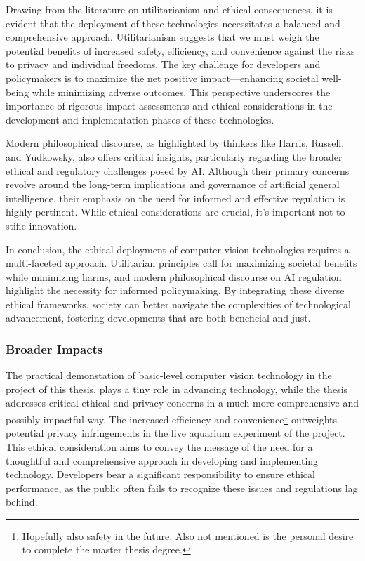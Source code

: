Drawing from the literature on utilitarianism and ethical consequences, it is evident that the deployment of these technologies necessitates a balanced and comprehensive approach. Utilitarianism suggests that we must weigh the potential benefits of increased safety, efficiency, and convenience against the risks to privacy and individual freedoms. The key challenge for developers and policymakers is to maximize the net positive impact—enhancing societal well-being while minimizing adverse outcomes. This perspective underscores the importance of rigorous impact assessments and ethical considerations in the development and implementation phases of these technologies.

Modern philosophical discourse, as highlighted by thinkers like Harris, Russell, and Yudkowsky, also offers critical insights, particularly regarding the broader ethical and regulatory challenges posed by AI. Although their primary concerns revolve around the long-term implications and governance of artificial general intelligence, their emphasis on the need for informed and effective regulation is highly pertinent. While ethical considerations are crucial, it's important not to stifle innovation. 

In conclusion, the ethical deployment of computer vision technologies requires a multi-faceted approach. Utilitarian principles call for maximizing societal benefits while minimizing harms, and modern philosophical discourse on AI regulation highlight the necessity for informed policymaking. By integrating these diverse ethical frameworks, society can better navigate the complexities of technological advancement, fostering developments that are both beneficial and just.

\subsubsection{Broader Impacts}
The practical demonstation of basic-level computer vision technology in the project of this thesis, plays a tiny role in advancing technology, while the thesis addresses critical ethical and privacy concerns in a much more comprehensive and possibly impactful way. The increased efficiency and convenience\footnote{Hopefully also safety in the future. Also not mentioned is the personal desire to complete the master thesis degree.} outweights potential privacy infringements in the live aquarium experiment of the project. This ethical consideration aims to convey the message of the need for a thoughtful and comprehensive approach in developing and implementing technology. Developers bear a significant responsibility to ensure ethical performance, as the public often fails to recognize these issues and regulations lag behind.

